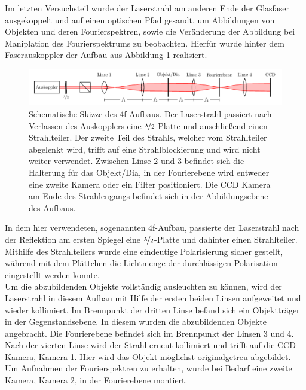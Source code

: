 

Im letzten Versuchsteil wurde der Laserstrahl am anderen Ende der Glasfaser ausgekoppelt und auf einen optischen Pfad gesandt, um Abbildungen von Objekten und deren Fourierspektren, sowie die Veränderung der Abbildung bei Maniplation des Fourierspektrums zu beobachten. Hierfür wurde hinter dem Faserauskoppler der Aufbau aus Abbildung \ref{fig:4f-aufbau} realisiert. \\

\begin{figure}[h]
	\centering
	\includegraphics[width=1\linewidth]{graphs/versuchsaufbau/4f-aufbau}
	\caption[Schematische Skizze des 4f-Aufbaus]{
		Schematische Skizze des 4f-Aufbaus. Der Laserstrahl passiert nach Verlassen des Auskopplers eine $\nicefrac{\lambda}{2}$-Platte und anschließend einen Strahlteiler. Der zweite Teil des Strahls, welcher vom Strahlteiler abgelenkt wird, trifft auf eine Strahlblockierung und wird nicht weiter verwendet. Zwischen Linse 2 und 3 befindet sich die Halterung für das Objekt/Dia, in der Fourierebene wird entweder eine zweite Kamera oder ein Filter positioniert. Die CCD Kamera am Ende des Strahlengangs befindet sich in der Abbildungsebene des Aufbaus.
	}
	\label{fig:4f-aufbau}
\end{figure}

In dem hier verwendeten, sogenannten 4f-Aufbau, passierte der Laserstrahl nach der Reflektion am ersten Spiegel eine $\nicefrac{\lambda}{2}$-Platte und dahinter einen Strahlteiler. Mithilfe des Strahlteilers wurde eine eindeutige Polarisierung sicher gestellt, während mit dem Plättchen die Lichtmenge der durchlässigen Polarisation eingestellt werden konnte.\\

Um die abzubildenden Objekte vollständig ausleuchten zu können, wird der Laserstrahl in diesem Aufbau mit Hilfe der ersten beiden Linsen aufgeweitet und wieder kollimiert. Im Brennpunkt der dritten Linse befand sich ein Objektträger in der Gegenstandsebene. In diesem wurden die abzubildenden Objekte angebracht. Die Fourierebene befindet sich im Brennpunkt der Linsen 3 und 4. Nach der vierten Linse wird der Strahl erneut kollimiert und trifft auf die CCD Kamera, Kamera 1. Hier wird das Objekt möglichst originalgetreu abgebildet. Um Aufnahmen der Fourierspektren zu erhalten, wurde bei Bedarf eine zweite Kamera, Kamera 2, in der Fourierebene montiert. \\ 

